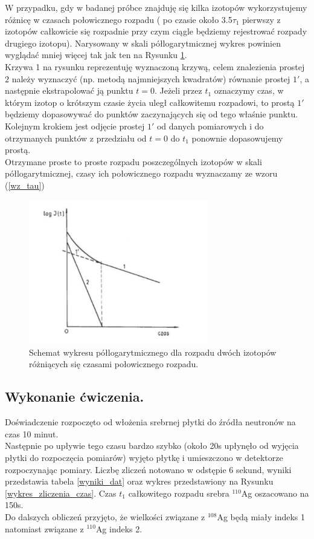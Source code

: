 \documentclass{article}
\begin{document}
W przypadku, gdy w badanej próbce znajduję się kilka izotopów wykorzystujemy różnicę w czasach połowicznego rozpadu ( po czasie około 3.5$\tau _1$ pierwszy z izotopów całkowicie się rozpadnie przy czym ciągle będziemy rejestrować rozpady drugiego izotopu). Narysowany w skali półlogarytmicznej wykres powinien wyglądać mniej więcej tak jak ten na Rysunku \ref{schemat}. \\
Krzywa 1 na rysunku reprezentuję wyznaczoną krzywą, celem znalezienia prostej $2$ należy wyznaczyć (np. metodą najmniejszych kwadratów) równanie prostej $1'$, a następnie ekstrapolować ją punktu $t=0$. Jeżeli przez $t_1$ oznaczymy czas, w którym izotop o krótszym czasie życia uległ całkowitemu rozpadowi, to prostą $1'$ będziemy dopasowywać do punktów zaczynających się od tego właśnie punktu. Kolejnym krokiem jest odjęcie prostej $1'$ od danych pomiarowych i do otrzymanych punktów z przedziału od $t=0$ do $t_1$ ponownie dopasowujemy prostą.\\
Otrzymane proste to proste rozpadu poszczególnych izotopów w skali półlogarytmicznej, czasy ich połowicznego rozpadu wyznaczamy ze wzoru (\ref{wz_tau})

\begin{figure}[h]
	\centering
	\includegraphics[width=0.7\textwidth]{images/schemat.png}
	\caption{Schemat wykresu półlogarytmicznego dla rozpadu dwóch izotopów różniących się czasami połowicznego rozpadu.}
	\label{schemat}
\end{figure}



\subsection{Wykonanie ćwiczenia.}
Doświadczenie rozpoczęto od włożenia srebrnej płytki do źródła neutronów na czas 10 minut.\\
Następnie po upływie tego czasu bardzo szybko (około 20s upłynęło od wyjęcia płytki do rozpoczęcia pomiarów) wyjęto płytkę i umieszczono w detektorze  rozpoczynając pomiary. Liczbę zliczeń notowano w odstępie 6 sekund, wyniki przedstawia tabela \ref{wyniki_dat} oraz wykres przedstawiony na Rysunku \ref{wykres_zliczenia_czas}. Czas $t_1$ całkowitego rozpadu srebra $^{110}$Ag oszacowano na 150s.\\
Do dalszych obliczeń przyjęto, że wielkości związane z $^{108}$Ag będą miały indeks 1 natomiast związane z $^{110}$Ag indeks 2.\\
\end{document}
